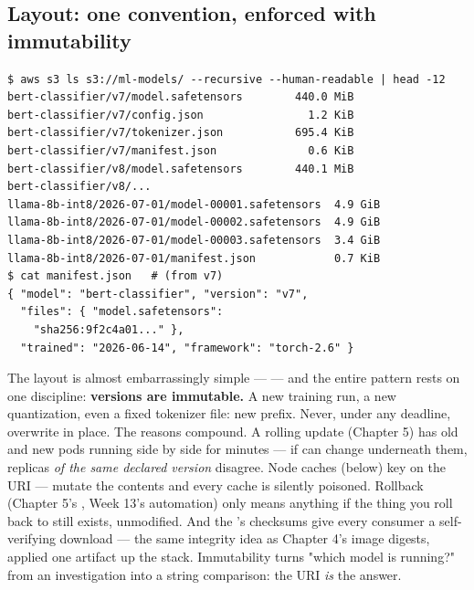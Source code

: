 \subsection*{Layout: one convention, enforced with immutability}

\begin{terminalbox}
\begin{Verbatim}[breaklines=true,breakanywhere=true,fontsize=\small,formatcom=\color{tbbtermfg},codes=\tbbcodeactive]
$ aws s3 ls s3://ml-models/ --recursive --human-readable | head -12
bert-classifier/v7/model.safetensors        440.0 MiB
bert-classifier/v7/config.json                1.2 KiB
bert-classifier/v7/tokenizer.json           695.4 KiB
bert-classifier/v7/manifest.json              0.6 KiB
bert-classifier/v8/model.safetensors        440.1 MiB
bert-classifier/v8/...
llama-8b-int8/2026-07-01/model-00001.safetensors  4.9 GiB
llama-8b-int8/2026-07-01/model-00002.safetensors  4.9 GiB
llama-8b-int8/2026-07-01/model-00003.safetensors  3.4 GiB
llama-8b-int8/2026-07-01/manifest.json            0.7 KiB
$ cat manifest.json   # (from v7)
{ "model": "bert-classifier", "version": "v7",
  "files": { "model.safetensors":
    "sha256:9f2c4a01..." },
  "trained": "2026-06-14", "framework": "torch-2.6" }
\end{Verbatim}
\end{terminalbox}

The layout is almost embarrassingly simple —  — and the entire pattern rests on one discipline: \textbf{versions are immutable.} A new training run, a new quantization, even a fixed tokenizer file: new prefix. Never, under any deadline, overwrite  in place. The reasons compound. A rolling update (Chapter 5) has old and new pods running side by side for minutes — if  can change underneath them, replicas \textit{of the same declared version} disagree. Node caches (below) key on the URI — mutate the contents and every cache is silently poisoned. Rollback (Chapter 5's , Week 13's automation) only means anything if the thing you roll back to still exists, unmodified. And the 's checksums give every consumer a self-verifying download — the same integrity idea as Chapter 4's image digests, applied one artifact up the stack. Immutability turns "which model is running?" from an investigation into a string comparison: the URI \textit{is} the answer.


